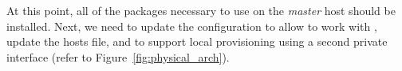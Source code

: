 At this point, all of the packages necessary to use \Warewulf{} on the {\em
master} host should be installed. Next, we need to update the configuration
to allow \Warewulf{} to work with \baseOS{}, update the hosts file, and to
support local provisioning using a second private interface (refer to
Figure~\ref{fig:physical_arch}).
